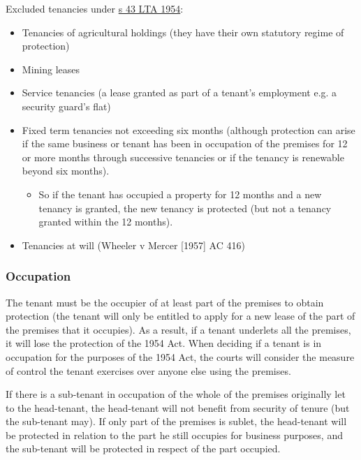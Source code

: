 \documentclass[
]{article}
\providecommand{\tightlist}{%
  \setlength{\itemsep}{0pt}\setlength{\parskip}{0pt}}
\begin{document}
Excluded tenancies under
\href{https://www.legislation.gov.uk/ukpga/Eliz2/2-3/56/section/43}{s 43
LTA 1954}:

\begin{itemize}
\tightlist
\item
  Tenancies of agricultural holdings (they have their own statutory
  regime of protection)
\item
  Mining leases
\item
  Service tenancies (a lease granted as part of a tenant's employment
  e.g. a security guard's flat)
\item
  Fixed term tenancies not exceeding six months (although protection can
  arise if the same business or tenant has been in occupation of the
  premises for 12 or more months through successive tenancies or if the
  tenancy is renewable beyond six months).

  \begin{itemize}
  \tightlist
  \item
    So if the tenant has occupied a property for 12 months and a new
    tenancy is granted, the new tenancy is protected (but not a tenancy
    granted within the 12 months).
  \end{itemize}
\item
  Tenancies at will (Wheeler v Mercer {[}1957{]} AC 416)
\end{itemize}

\hypertarget{occupation}{%
\subsubsection{Occupation}\label{occupation}}

The tenant must be the occupier of at least part of the premises to
obtain protection (the tenant will only be entitled to apply for a new
lease of the part of the premises that it occupies). As a result, if a
tenant underlets all the premises, it will lose the protection of the
1954 Act. When deciding if a tenant is in occupation for the purposes of
the 1954 Act, the courts will consider the measure of control the tenant
exercises over anyone else using the premises.

If there is a sub-tenant in occupation of the whole of the premises
originally let to the head-tenant, the head-tenant will not benefit from
security of tenure (but the sub-tenant may). If only part of the
premises is sublet, the head-tenant will be protected in relation to the
part he still occupies for business purposes, and the sub-tenant will be
protected in respect of the part occupied.
\end{document}
